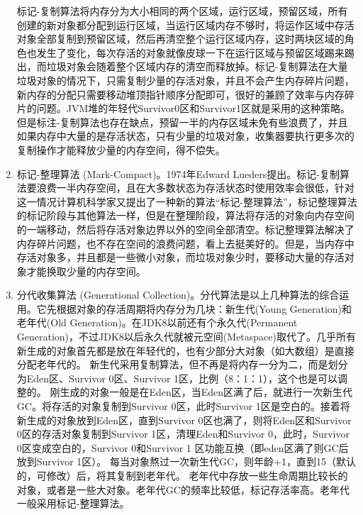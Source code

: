 \documentclass[../../../interview-questions.tex]{subfiles}
\begin{document}
\begin{enumerate}
    标记-复制算法将内存分为大小相同的两个区域，运行区域，预留区域，所有创建的新对象都分配到运行区域，当运行区域内存不够时，将运作区域中存活对象全部复制到预留区域，然后再清空整个运行区域内存，这时两块区域的角色也发生了变化，每次存活的对象就像皮球一下在运行区域与预留区域踢来踢出，而垃圾对象会随着整个区域内存的清空而释放掉。标记-复制算法在大量垃圾对象的情况下，只需复制少量的存活对象，并且不会产生内存碎片问题，新内存的分配只需要移动堆顶指针顺序分配即可，很好的兼顾了效率与内存碎片的问题。JVM堆的年轻代Survivor0区和Survivor1区就是采用的这种策略。但是标注-复制算法也存在缺点，预留一半的内存区域未免有些浪费了，并且如果内存中大量的是存活状态，只有少量的垃圾对象，收集器要执行更多次的复制操作才能释放少量的内存空间，得不偿失。
    \item{标记-整理算法 (Mark-Compact)。}1974年Edward Lueders提出。标记-复制算法要浪费一半内存空间，且在大多数状态为存活状态时使用效率会很低，针对这一情况计算机科学家又提出了一种新的算法“标记-整理算法”，标记整理算法的标记阶段与其他算法一样，但是在整理阶段，算法将存活的对象向内存空间的一端移动，然后将存活对象边界以外的空间全部清空。标记整理算法解决了内存碎片问题，也不存在空间的浪费问题，看上去挺美好的。但是，当内存中存活对象多，并且都是一些微小对象，而垃圾对象少时，要移动大量的存活对象才能换取少量的内存空间。
    \item{分代收集算法 (Generational Collection)。}分代算法是以上几种算法的综合运用。它先根据对象的存活周期将内存分为几块：新生代(Young Generation)和老年代(Old Generation)。在JDK8以前还有个永久代(Permanent Generation)，不过JDK8以后永久代就被元空间(Metaspace)取代了。几乎所有新生成的对象首先都是放在年轻代的，也有少部分大对象（如大数组）是直接分配老年代的。
    新生代采用复制算法，但不再是将内存一分为二，而是划分为Eden区、Survivor 0区、Survivor 1区，比例（8：1：1），这个也是可以调整的。
    刚生成的对象一般是在Eden区，当Eden区满了后，就进行一次新生代GC。将存活的对象复制到Survivor 0区，此时Survivor 1区是空白的。接着将新生成的对象放到Eden区，直到Survivor 0区也满了，则将Eden区和Survivor 0区的存活对象复制到Survivor 1区，清理Eden和Survivor 0，此时，Survivor 0区变成空白的，Survivor 0和Survivor 1 区功能互换（即eden区满了则GC后放到Survivor 1区）。
    每当对象熬过一次新生代GC，则年龄+1，直到15（默认的，可修改）后，将其复制到老年代。
    老年代中存放一些生命周期比较长的对象，或者是一些大对象。老年代GC的频率比较低，标记存活率高。老年代一般采用标记-整理算法。
\end{enumerate}
\end{document}
